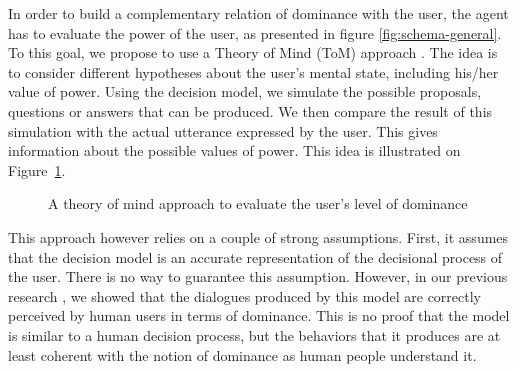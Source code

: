 \documentclass[conference, letterpaper]{IEEEtran}
\begin{document}
	In order to build a complementary relation of dominance with the user, the agent has to evaluate the power of the user, as presented in figure \ref{fig:schema-general}. To this goal, we propose to use a Theory of Mind (ToM) approach \cite{premack1978does}. The idea is to consider different hypotheses about the user's mental state, including his/her value of power. Using the decision model, we simulate the possible proposals, questions or answers that can be produced. We then compare the result of this simulation with the actual utterance expressed by the user. This gives information about the possible values of power. This idea is illustrated on Figure~\ref{fig:tom}.
	
	\begin{figure}
		\caption{A theory of mind approach to evaluate the user's level of dominance} 
		\label{fig:tom}
	\end{figure} 
	
	This approach however relies on a couple of strong assumptions. First, it assumes that the decision model is an accurate representation of the decisional process of the user. There is no way to guarantee this assumption. However, in our previous research \cite{ouali2017computational}, we showed that the dialogues produced by this model are correctly perceived by human users in terms of dominance. This is no proof that the model is similar to a human decision process, but the behaviors that it produces are at least coherent with the notion of dominance as human people understand it.
	
\end{document}
